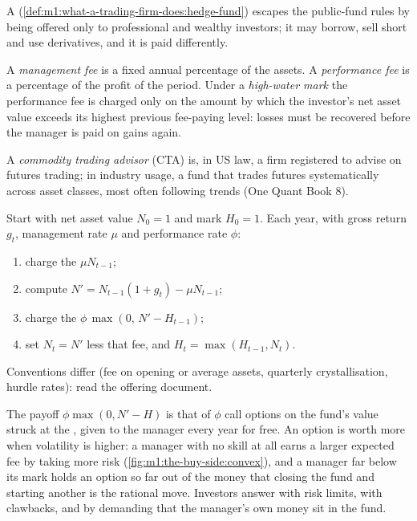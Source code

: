 A  (\cref{def:m1:what-a-trading-firm-does:hedge-fund}) escapes the
public-fund rules by being offered only to professional and wealthy
investors; it may borrow, sell short and use derivatives, and it is paid
differently.

\begin{definition}\label{def:m1:the-buy-side:fees}
A \emph{management fee} is a fixed annual percentage of
the assets. A \emph{performance fee} is a percentage
of the profit of the period. Under a
\emph{high-water mark} the performance fee is charged
only on the amount by which the investor's net asset value exceeds its
highest previous fee-paying level: losses must be recovered before the
manager is paid on gains again.
\end{definition}

\begin{definition}\label{def:m1:the-buy-side:cta}
A \emph{commodity trading advisor} (CTA) is,
in US law, a firm registered to advise on futures trading; in industry usage,
a fund that trades futures systematically across asset classes, most often
following trends (One Quant Book 8).
\end{definition}

\begin{method}\label{met:m1:the-buy-side:hwm}
Start with net asset value $N_0 = 1$ and mark $H_0 = 1$. Each year, with
gross return $g_t$, management rate $\mu$ and performance rate $\phi$:
\begin{enumerate}
\item charge the  $\mu N_{t-1}$;
\item compute $N' = N_{t-1}(1+g_t) - \mu N_{t-1}$;
\item charge the  $\phi\,\max(0,\, N' - H_{t-1})$;
\item set $N_t = N'$ less that fee, and $H_t = \max(H_{t-1}, N_t)$.
\end{enumerate}
Conventions differ (fee on opening or average assets, quarterly
crystallisation, hurdle rates): read the offering document.
\end{method}

\begin{remark}\label{rem:m1:the-buy-side:option}
The payoff $\phi\max(0, N'-H)$ is that of $\phi$ call options on the fund's
value struck at the , given to the manager every year for
free. An option is worth more when volatility is higher: a manager with no
skill at all earns a larger expected fee by taking more risk
(\cref{fig:m1:the-buy-side:convex}), and a manager far below its mark holds
an option so far out of the money that closing the fund and starting another
is the rational move. Investors answer with risk limits, with clawbacks, and
by demanding that the manager's own money sit in the fund.
\end{remark}


